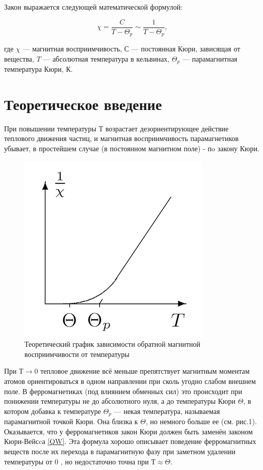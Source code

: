 \documentclass[12pt]{kiarticle} %
\begin{document}
Закон выражается следующей математической формулой:

 \begin{equation}\label{QW}
 \chi ={\frac  {C}{T-\Theta_p}} \sim \frac{1}{T - \Theta_p}, 
 \end{equation}
 
где $ \chi  $ — магнитная восприимчивость, $ С $ — постоянная Кюри, зависящая от вещества, $ T $ — абсолютная температура в кельвинах, $ \Theta_p  $ — парамагнитная температура Кюри, К.

\section{Теоретическое введение}

При повышении температуры $ Т $ возрастает дезориентирующее действие теплового движения частиц, и магнитная восприимчивость парамагнетиков
убывает, в простейшем случае (в постоянном магнитном
поле) - пo закону Кюри.

\begin{figure} 
	\includegraphics{342_gr}
	\caption{Теоретический график зависимости обратной магнитной восприимчивости от температуры}
\end{figure}

При $ Т \to 0 $ тепловое движение всё меньше препятствует магнитным моментам атомов ориентироваться в одном направлении при сколь
угодно слабом внешнем поле. В ферромагнетиках (под влиянием обменных сил) это происходит при понижении температуры не до абсолютного
нуля, а до температуры Кюри $ \Theta $, в котором добавка к температуре $ \Theta_p $ --- некая температура, называемая парамагнитной точкой Кюри. Она близка к $ \Theta $, но немного больше ее (см. рис.1). Оказывается, что у ферромагнетиков закон Кюри должен быть заменён законом Кюри-Вейсcа \eqref{QW}. Эта формула хорошо описывает поведение ферромагнитных  веществ после их перехода в парамагнитную фазу при заметном удалении температуры от 0 , но недостаточно точна при $ Т \approx \Theta$.
\end{document}
